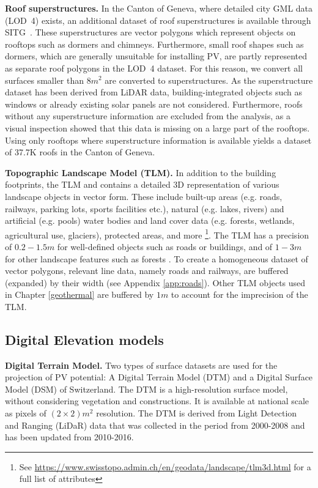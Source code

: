 \textbf{Roof superstructures.}
In the Canton of Geneva, where detailed city GML data (LOD~4) exists, an additional dataset of roof superstructures is available through SITG~\cite{sitg_superstructures_2019}. %
These superstructures are vector polygons which represent objects on rooftops such as dormers and chimneys. 
Furthermore, small roof shapes such as dormers, which are generally unsuitable for installing PV, are partly represented as separate roof polygons in the LOD~4 dataset.
For this reason, we convert all surfaces smaller than $8m^2$ are converted to superstructures. 
As the superstructure dataset has been derived from LiDAR data, building-integrated objects such as windows or already existing solar panels are not considered. 
Furthermore, roofs without any superstructure information are excluded from the analysis, as a visual inspection showed that this data is missing on a large part of the rooftops. Using only rooftops where superstructure information is available yields a dataset of 37.7K roofs in the Canton of Geneva. 

\textbf{Topographic Landscape Model (TLM).}
In addition to the building footprints, the TLM \cite{swisstopo_swisstlm3d_2018} and contains a detailed 3D representation of various landscape objects in vector form. 
These include built-up areas (e.g. roads, railways, parking lots, sports facilities etc.), natural (e.g. lakes, rivers) and artificial (e.g. pools) water bodies and land cover data (e.g. forests, wetlands, agricultural use, glaciers), protected areas, and more
\footnote{See \url{https://www.swisstopo.admin.ch/en/geodata/landscape/tlm3d.html} for a full list of attributes}.
The TLM has a precision of $0.2-1.5m$ for well-defined objects such as roads or buildings, and of $1 - 3m$ for other landscape features such as forests \cite{swisstopo_swisstlm3d_2018}. 
To create a homogeneous dataset of vector polygons, relevant line data, namely roads and railways, are buffered (expanded) by their width (see Appendix \ref{app:roads}).
Other TLM objects used in Chapter \ref{geothermal} are buffered by $1m$ to account for the imprecision of the TLM.

\subsection{Digital Elevation models}
\textbf{Digital Terrain Model.} Two types of surface datasets are used for the projection of PV potential: A Digital Terrain Model (DTM) and a Digital Surface Model (DSM) of Switzerland. The DTM is a high-resolution surface model, without considering vegetation and constructions. It is available at national scale as pixels of $(2\times2)m^2$ resolution. The DTM is derived from Light Detection and Ranging (LiDaR) data that was collected in the period from 2000-2008 and has been updated from 2010-2016.

